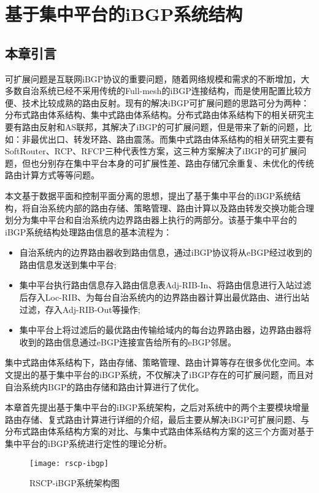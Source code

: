 \chapter{基于集中平台的iBGP系统结构}
\label{cha:architecture}


\section{本章引言}
可扩展问题是互联网iBGP协议的重要问题，随着网络规模和需求的不断增加，大多数自治系统已经不采用传统的Full-mesh的iBGP连接结构，而是使用配置比较方便、技术比较成熟的路由反射。现有的解决iBGP可扩展问题的思路可分为两种：分布式路由体系结构、集中式路由体系结构。分布式路由体系结构下的相关研究主要有路由反射和AS联邦，其解决了iBGP的可扩展问题，但是带来了新的问题，比如：非最优出口、转发环路、路由震荡。而集中式路由体系结构的相关研究主要有SoftRouter、RCP、RFCP三种代表性方案，这三种方案解决了iBGP的可扩展问题，但也分别存在集中平台本身的可扩展性差、路由存储冗余重复、未优化的传统路由计算方式等等问题。

本文基于数据平面和控制平面分离的思想，提出了基于集中平台的iBGP系统结构，将自治系统内部的路由存储、策略管理、路由计算以及路由转发交换功能合理划分为集中平台和自治系统内边界路由器上执行的两部分。该基于集中平台的iBGP系统结构处理路由信息的基本流程为：
\begin{itemize}
  \item 自治系统内的边界路由器收到路由信息，通过iBGP协议将从eBGP经过收到的路由信息发送到集中平台;
  \item 集中平台执行路由信息存入路由信息表Adj-RIB-In、将路由信息进行入站过滤后存入Loc-RIB、为每台自治系统内的边界路由器计算出最优路由、进行出站过滤，存入Adj-RIB-Out等操作;
  \item 集中平台上将过滤后的最优路由传输给域内的每台边界路由器，边界路由器将收到的路由信息通过eBGP连接宣告给所有的eBGP邻居。
\end{itemize}

集中式路由体系结构下，路由存储、策略管理、路由计算等存在很多优化空间。本文提出的基于集中平台的iBGP系统，不仅解决了iBGP存在的可扩展问题，而且对自治系统内BGP的路由存储和路由计算进行了优化。

本章首先提出基于集中平台的iBGP系统架构，之后对系统中的两个主要模块增量路由存储、复式路由计算进行详细的介绍，最后主要从解决iBGP可扩展问题、与分布式路由体系结构方案的对比、与集中式路由体系结构方案的这三个方面对基于集中平台的iBGP系统进行定性的理论分析。



\begin{figure}
  \centering
  \texttt{[image: rscp-ibgp]}
  \caption{RSCP-iBGP系统架构图}
  \label{fig:rscp-ibgp}
\end{figure}

